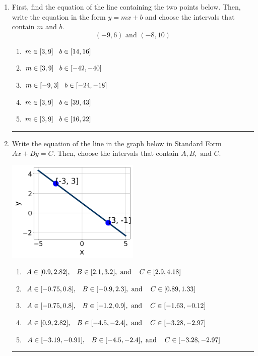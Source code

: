 \documentclass[14pt]{extbook}
\newcommand{\litem}[1]{\item#1\hspace*{-1cm}\rule{\textwidth}{0.4pt}}
\begin{document}
\begin{enumerate}
\litem{
First, find the equation of the line containing the two points below. Then, write the equation in the form $ y=mx+b $ and choose the intervals that contain $m$ and $b$.\[ (-9, 6) \text{ and } (-8, 10) \]\begin{enumerate}[label=\Alph*.]
\item \( m \in [3, 9] \hspace*{3mm} b \in [14, 16] \)
\item \( m \in [3, 9] \hspace*{3mm} b \in [-42, -40] \)
\item \( m \in [-9, 3] \hspace*{3mm} b \in [-24, -18] \)
\item \( m \in [3, 9] \hspace*{3mm} b \in [39, 43] \)
\item \( m \in [3, 9] \hspace*{3mm} b \in [16, 22] \)

\end{enumerate} }
\litem{
Write the equation of the line in the graph below in Standard Form $Ax+By=C$. Then, choose the intervals that contain $A, B, \text{ and } C$.
\begin{center}
    \includegraphics[width=0.5\textwidth]{../Figures/linearGraphToStandardCopyC.png}
\end{center}
\begin{enumerate}[label=\Alph*.]
\item \( A \in [0.9, 2.82], \hspace{3mm} B \in [2.1, 3.2], \text{ and } \hspace{3mm} C \in [2.9, 4.18] \)
\item \( A \in [-0.75, 0.8], \hspace{3mm} B \in [-0.9, 2.3], \text{ and } \hspace{3mm} C \in [0.89, 1.33] \)
\item \( A \in [-0.75, 0.8], \hspace{3mm} B \in [-1.2, 0.9], \text{ and } \hspace{3mm} C \in [-1.63, -0.12] \)
\item \( A \in [0.9, 2.82], \hspace{3mm} B \in [-4.5, -2.4], \text{ and } \hspace{3mm} C \in [-3.28, -2.97] \)
\item \( A \in [-3.19, -0.91], \hspace{3mm} B \in [-4.5, -2.4], \text{ and } \hspace{3mm} C \in [-3.28, -2.97] \)


\end{enumerate}}
\end{enumerate}
\end{document}
